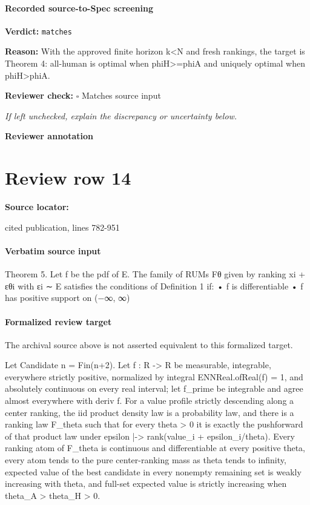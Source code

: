 \documentclass[10pt]{article}
\newcommand{\reviewerbox}{%
  \par\noindent\fbox{\parbox{0.96\linewidth}{\rule{0pt}{0.38in}}}\par
}
\newcommand{\reviewmatch}[1]{%
  \par\noindent\textbf{Reviewer check:} $\square$\; #1\par
  \noindent\emph{If left unchecked, explain the discrepancy or uncertainty below.}\par
}
\begin{document}
\paragraph{Recorded source-to-Spec screening}
\textbf{Verdict:} \texttt{matches}
\\
{\raggedright
\textbf{Reason:} With the approved finite horizon k<N and fresh rankings, the target is Theorem 4:\allowbreak{} all-\allowbreak{}human is optimal when phiH>=phiA and uniquely optimal when phiH>phiA.\allowbreak{}
\par}
\reviewmatch{Matches source input}
\noindent\textbf{Reviewer annotation}\par
\reviewerbox
\clearpage
\hypertarget{source-claim-54f72d882fb14d8c}{}
\section*{Review row 14}
\textbf{Source locator:} {\footnotesize\raggedright cited publication, lines 782-\allowbreak{}951\par}
\paragraph{Verbatim source input}
\begin{ReviewVerbatim}
Theorem 5. Let f be the pdf of E. The family of RUMs Fθ given by ranking xi + εθi with εi ∼ E satisfies
the conditions of Definition 1 if:
• f is differentiable
• f has positive support on (−∞, ∞)
\end{ReviewVerbatim}


\paragraph{Formalized review target}
The archival source above is not asserted equivalent to this formalized target.
\begin{ReviewVerbatim}
Let Candidate n = Fin(n+2). Let f : R -> R be measurable, integrable, everywhere strictly positive, normalized by integral ENNReal.ofReal(f) = 1, and absolutely continuous on every real interval; let f_prime be integrable and agree almost everywhere with deriv f. For a value profile strictly descending along a center ranking, the iid product density law is a probability law, and there is a ranking law F_theta such that for every theta > 0 it is exactly the pushforward of that product law under epsilon |-> rank(value_i + epsilon_i/theta). Every ranking atom of F_theta is continuous and differentiable at every positive theta, every atom tends to the pure center-ranking mass as theta tends to infinity, expected value of the best candidate in every nonempty remaining set is weakly increasing with theta, and full-set expected value is strictly increasing when theta_A > theta_H > 0.
\end{ReviewVerbatim}
\end{document}

